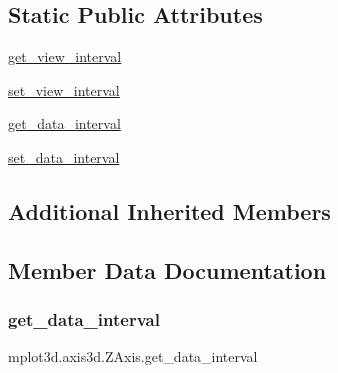 \subsection*{Static Public Attributes}
\begin{DoxyCompactItemize}
\item 
\hyperlink{classmplot3d_1_1axis3d_1_1ZAxis_acb28c350531252debe6ec936165264eb}{get\+\_\+view\+\_\+interval}
\item 
\hyperlink{classmplot3d_1_1axis3d_1_1ZAxis_afe38a114a6692af0cadf4445d5c58a08}{set\+\_\+view\+\_\+interval}
\item 
\hyperlink{classmplot3d_1_1axis3d_1_1ZAxis_ae19cf14e6ca43b93e90571f2a2d0f9a5}{get\+\_\+data\+\_\+interval}
\item 
\hyperlink{classmplot3d_1_1axis3d_1_1ZAxis_a6898dd2b378d9e055ec51e6aab87e019}{set\+\_\+data\+\_\+interval}
\end{DoxyCompactItemize}
\subsection*{Additional Inherited Members}


\subsection{Member Data Documentation}
\mbox{\label{classmplot3d_1_1axis3d_1_1ZAxis_ae19cf14e6ca43b93e90571f2a2d0f9a5}} 
\subsubsection{\texorpdfstring{get\+\_\+data\+\_\+interval}{get\_data\_interval}}
{\footnotesize\ttfamily mplot3d.\+axis3d.\+Z\+Axis.\+get\+\_\+data\+\_\+interval\hspace{0.3cm}{\ttfamily [static]}}

\mbox{\label{classmplot3d_1_1axis3d_1_1ZAxis_acb28c350531252debe6ec936165264eb}} 

